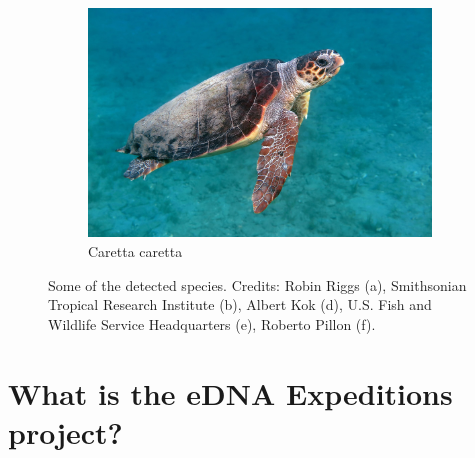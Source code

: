 \documentclass[10pt]{article}
\begin{document}
\begin{figure}[h]
\begin{subfigure}[b]{0.48\textwidth}
         \includegraphics[width=\textwidth]{images/caretta_caretta.jpg}
         \caption{Caretta caretta}
     \end{subfigure}
     \caption{Some of the detected species. Credits: Robin Riggs (a), Smithsonian Tropical Research Institute (b), Albert Kok (d), U.S. Fish and Wildlife Service Headquarters (e), Roberto Pillon (f).}
\end{figure}

\clearpage

\section*{What is the eDNA Expeditions project?}
\end{document}
